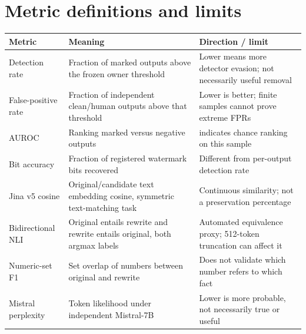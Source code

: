 \section{Metric definitions and
limits}\label{record-docs-watermarking-metrics-md-metric-definitions-and-limits}

{\scriptsize\setlength{\tabcolsep}{3pt} %
\begin{longtable}[]{@{}
  >{\raggedright\arraybackslash}p{}
  >{\raggedright\arraybackslash}p{}
  >{\raggedright\arraybackslash}p{}@{}}
\toprule\noalign{}
\begin{minipage}[b]{\linewidth}\raggedright
Metric
\end{minipage} & \begin{minipage}[b]{\linewidth}\raggedright
Meaning
\end{minipage} & \begin{minipage}[b]{\linewidth}\raggedright
Direction / limit
\end{minipage} \\
\midrule\noalign{}
\endhead
\bottomrule\noalign{}
\endlastfoot
Detection rate & Fraction of marked outputs above the frozen owner
threshold & Lower means more detector evasion; not necessarily useful
removal \\
False-positive rate & Fraction of independent clean/human outputs above
that threshold & Lower is better; finite samples cannot prove extreme
FPRs \\
AUROC & Ranking marked versus negative outputs & 0.5 indicates chance
ranking on this sample \\
Bit accuracy & Fraction of registered watermark bits recovered &
Different from per-output detection rate \\
Jina v5 cosine & Original/candidate text embedding cosine, symmetric
text-matching task & Continuous similarity; not a preservation
percentage \\
Bidirectional NLI & Original entails rewrite and rewrite entails
original, both argmax labels & Automated equivalence proxy; 512-token
truncation can affect it \\
Numeric-set F1 & Set overlap of numbers between original and rewrite &
Does not validate which number refers to which fact \\
Mistral perplexity & Token likelihood under independent Mistral-7B &
Lower is more probable, not necessarily true or useful \\

\end{longtable}}
